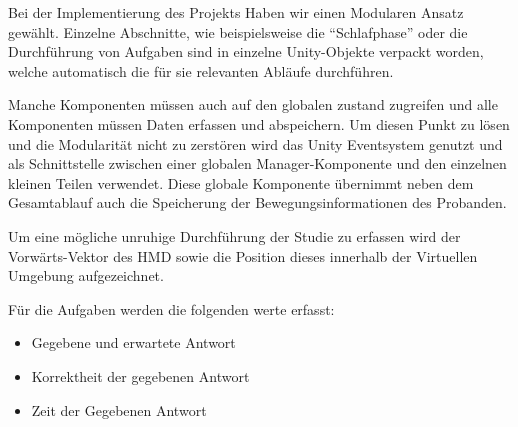 Bei der Implementierung des Projekts Haben wir einen Modularen Ansatz gewählt. Einzelne Abschnitte, wie beispielsweise die "`Schlafphase"' oder die Durchführung von Aufgaben sind in einzelne Unity-Objekte verpackt worden, welche automatisch die für sie relevanten Abläufe durchführen. 

Manche Komponenten müssen auch auf den globalen zustand zugreifen und alle Komponenten müssen Daten erfassen und abspeichern. Um diesen Punkt zu lösen und die Modularität nicht zu zerstören wird das Unity Eventsystem genutzt und als Schnittstelle zwischen einer globalen Manager-Komponente und den einzelnen kleinen Teilen verwendet. 
Diese globale Komponente übernimmt neben dem Gesamtablauf auch die Speicherung der Bewegungsinformationen des Probanden. 

Um eine mögliche unruhige Durchführung der Studie zu erfassen wird der Vorwärts-Vektor des HMD sowie die Position dieses innerhalb der Virtuellen Umgebung aufgezeichnet.

Für die Aufgaben werden die folgenden werte erfasst:
\begin{itemize}
    \item Gegebene und erwartete Antwort
    \item Korrektheit der gegebenen Antwort
    \item Zeit der Gegebenen Antwort
\end{itemize}

